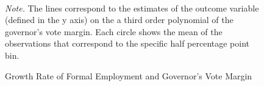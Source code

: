 \documentclass[dv_diss_main.tex]{subfiles}
\begin{document}
\begin{figure}[h]
	\begin{center}
        \\
        \caption{Growth Rate of Formal Employment and Governor's Vote Margin}\label{fig:rddplotformalemp}
	\end{center}
	\vspace{0.5em}
    \begin{figurenotes}
    {\footnotesize	
    \textit{Note. }The lines correspond to the estimates of the outcome variable  (defined in the y axis) on the a third order polynomial of the governor's vote margin. Each circle shows the mean of the observations that correspond to the specific half percentage point bin. }
	\end{figurenotes}

\end{figure}
\end{document}

